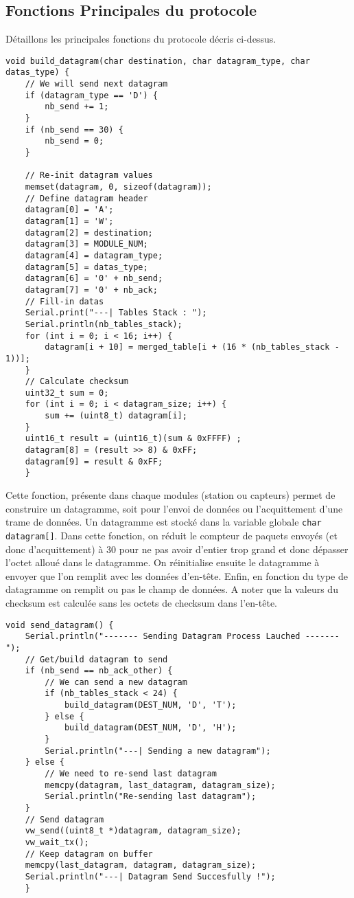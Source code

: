 \documentclass[a4paper]{article}
\begin{document}
\subsection{Fonctions Principales du protocole}

Détaillons les principales fonctions du protocole décris ci-dessus. 

\begin{lstlisting}
void build_datagram(char destination, char datagram_type, char datas_type) {
    // We will send next datagram 
    if (datagram_type == 'D') {
        nb_send += 1; 
    }
    if (nb_send == 30) {
        nb_send = 0; 
    }
    
    // Re-init datagram values
    memset(datagram, 0, sizeof(datagram)); 
    // Define datagram header
    datagram[0] = 'A'; 
    datagram[1] = 'W'; 
    datagram[2] = destination; 
    datagram[3] = MODULE_NUM; 
    datagram[4] = datagram_type; 
    datagram[5] = datas_type; 
    datagram[6] = '0' + nb_send; 
    datagram[7] = '0' + nb_ack;  
    // Fill-in datas 
    Serial.print("---| Tables Stack : ");
    Serial.println(nb_tables_stack);
    for (int i = 0; i < 16; i++) {
        datagram[i + 10] = merged_table[i + (16 * (nb_tables_stack - 1))];
    }
    // Calculate checksum 
    uint32_t sum = 0; 
    for (int i = 0; i < datagram_size; i++) {
        sum += (uint8_t) datagram[i]; 
    }
    uint16_t result = (uint16_t)(sum & 0xFFFF) ; 
    datagram[8] = (result >> 8) & 0xFF;
    datagram[9] = result & 0xFF;
    }
\end{lstlisting}

Cette fonction, présente dans chaque modules (station ou capteurs) permet de construire un datagramme, 
soit pour l'envoi de données ou l'acquittement d'une trame de données. 
Un datagramme est stocké dans la variable globale \texttt{char datagram[]}. 
Dans cette fonction, on réduit le compteur de paquets envoyés (et donc d'acquittement) à 30 pour ne pas 
avoir d'entier trop grand et donc dépasser l'octet alloué dans le datagramme. 
On réinitialise ensuite le datagramme à envoyer que l'on remplit avec les données d'en-tête. 
Enfin, en fonction du type de datagramme on remplit ou pas le champ de données. 
A noter que la valeurs du checksum est calculée sans les octets de checksum dans l'en-tête. 

\begin{lstlisting}
void send_datagram() {
    Serial.println("------- Sending Datagram Process Lauched -------"); 
    // Get/build datagram to send 
    if (nb_send == nb_ack_other) {
        // We can send a new datagram
        if (nb_tables_stack < 24) {
            build_datagram(DEST_NUM, 'D', 'T'); 
        } else {
            build_datagram(DEST_NUM, 'D', 'H'); 
        }
        Serial.println("---| Sending a new datagram"); 
    } else {
        // We need to re-send last datagram
        memcpy(datagram, last_datagram, datagram_size); 
        Serial.println("Re-sending last datagram"); 
    }
    // Send datagram 
    vw_send((uint8_t *)datagram, datagram_size);
    vw_wait_tx();
    // Keep datagram on buffer
    memcpy(last_datagram, datagram, datagram_size); 
    Serial.println("---| Datagram Send Succesfully !");
    }
\end{lstlisting}
\end{document}
